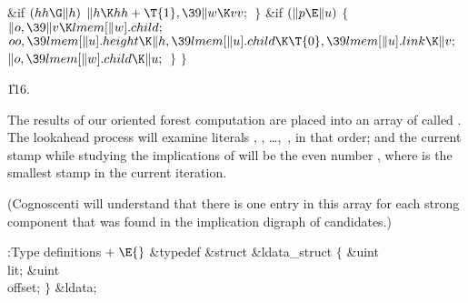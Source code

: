 \&{if} ${}(\\{hh}\G\|h){}$\1\5
${}\|h\K\\{hh}+\T{1},\39\|w\K\\{vv};{}$\2\6
\4${}\}{}$\2\6
\&{if} ${}(\|p\E\|u){}$\5
${}\{{}$\1\6
${}\|o,\39\|v\K\\{lmem}[\|w].\\{child};{}$\6
${}\\{oo},\39\\{lmem}[\|u].\\{height}\K\|h,\39\\{lmem}[\|u].\\{child}\K\T{0},%
\39\\{lmem}[\|u].\\{link}\K\|v;{}$\6
${}\|o,\39\\{lmem}[\|w].\\{child}\K\|u;{}$\6
\4${}\}{}$\2\6
\4${}\}{}$\2\par
\U116.\fi

The results of our oriented forest computation are placed into
an array of  called .
The lookahead process will
examine literals , ,
\dots,~,
in that order; and the current stamp while studying the implications
of  will be the even number , where
 is the smallest stamp in the current iteration.

(Cognoscenti will understand that there is one entry in this array
for each strong component that was found in the implication digraph
of candidates.)

\Y\B\4:Type definitions\X${}\mathrel+\E{}$\6
\&{typedef} \&{struct} \&{ldata\_struct} ${}\{{}$\1\6
\&{uint} \\{lit};\6
\&{uint} \\{offset};\2\6
${}\}{}$ \&{ldata};\par
\fi

